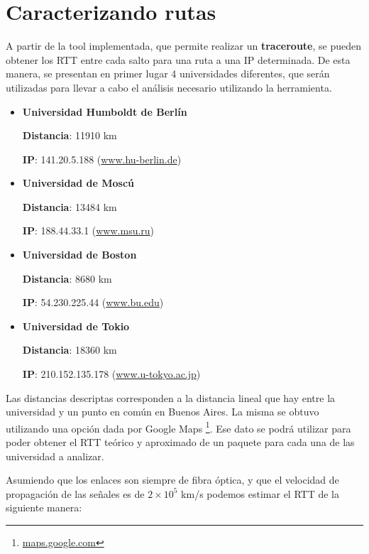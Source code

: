 \section{Caracterizando rutas}

A partir de la tool implementada, que permite realizar un \textbf{traceroute}, se pueden obtener los RTT 
entre cada salto para una ruta a una IP determinada. De esta manera, se presentan en primer lugar 4 universidades diferentes, que serán utilizadas para llevar a cabo el análisis necesario utilizando la herramienta.

\begin{itemize}
 \item {\bf Universidad Humboldt de Berlín}

	{\bf Distancia}: 11910 km

	{\bf IP}: 141.20.5.188 (\url{www.hu-berlin.de}{})

 \item {\bf Universidad de Moscú}

	{\bf Distancia}: 13484 km

	{\bf IP}: 188.44.33.1 (\url{www.msu.ru}{})

 \item {\bf Universidad de Boston}

	{\bf Distancia}: 8680 km

	{\bf IP}: 54.230.225.44 (\url{www.bu.edu}{})

 \item {\bf Universidad de Tokio}

	{\bf Distancia}: 18360 km

	{\bf IP}: 210.152.135.178 (\url{www.u-tokyo.ac.jp}{})

\end{itemize}

Las distancias descriptas corresponden a la distancia lineal que hay entre la universidad y un punto en común en Buenos Aires. La misma se obtuvo utilizando una opción dada por Google Maps \footnote{\url{maps.google.com}{}}. Ese dato se podrá utilizar para poder obtener el RTT teórico y aproximado de un paquete para cada una de las universidad a analizar.

Asumiendo que los enlaces son siempre de fibra óptica, y que el velocidad de propagación de las señales es de $2 \times 10^{5}$ km/s podemos estimar el RTT de la siguiente manera:

